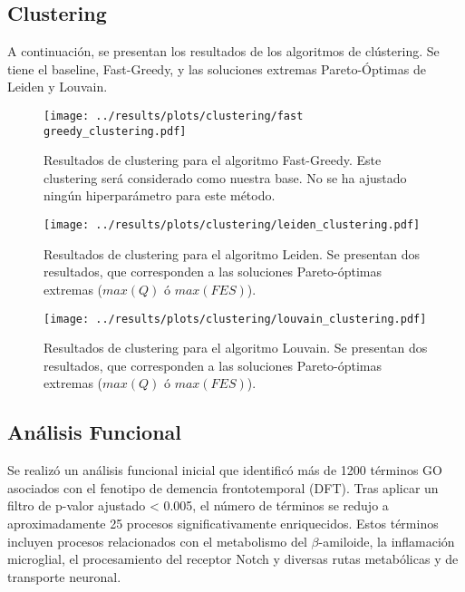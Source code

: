\subsection{Clustering}

A continuación, se presentan los resultados de los algoritmos de clústering. Se tiene el baseline, Fast-Greedy, y las soluciones extremas Pareto-Óptimas de Leiden y Louvain.

\begin{figure}[htbp!]
	\centering
	\texttt{[image: ../results/plots/clustering/fast greedy\_clustering.pdf]}
	\caption{Resultados de clustering para el algoritmo Fast-Greedy. Este clustering será considerado como nuestra base. No se ha ajustado ningún hiperparámetro para este método.}
	\label{fig:fastgreedy_clustering}
\end{figure}

\begin{figure}[htbp!]
	\centering
	\texttt{[image: ../results/plots/clustering/leiden\_clustering.pdf]}
	\caption{Resultados de clustering para el algoritmo Leiden. Se presentan dos resultados, que corresponden a las soluciones Pareto-óptimas extremas (\(max(Q)\) ó \(max(FES)\)).}
	\label{fig:leiden_clustering}
\end{figure}

\begin{figure}[htbp!]
	\centering
	\texttt{[image: ../results/plots/clustering/louvain\_clustering.pdf]}
	\caption{Resultados de clustering para el algoritmo Louvain. Se presentan dos resultados, que corresponden a las soluciones Pareto-óptimas extremas (\(max(Q)\) ó \(max(FES)\)).}
	\label{fig:louvain_clustering}
\end{figure}

\subsection{Análisis Funcional}

Se realizó un análisis funcional inicial que identificó más de 1200 términos GO asociados con el fenotipo de demencia frontotemporal (DFT). Tras aplicar un filtro de p-valor ajustado \textless{} 0.005, el número de términos se redujo a aproximadamente 25 procesos significativamente enriquecidos. Estos términos incluyen procesos relacionados con el metabolismo del \(\beta\)-amiloide, la inflamación microglial, el procesamiento del receptor Notch y diversas rutas metabólicas y de transporte neuronal.

